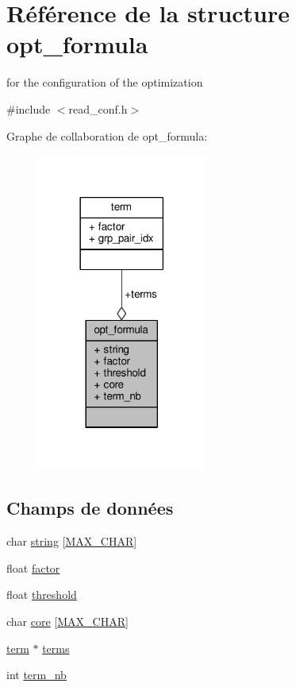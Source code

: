 \hypertarget{structopt__formula}{\section{Référence de la structure opt\+\_\+formula}
\label{structopt__formula}
}


for the configuration of the optimization  




{\ttfamily \#include $<$read\+\_\+conf.\+h$>$}



Graphe de collaboration de opt\+\_\+formula\+:\nopagebreak
\begin{figure}[H]
\begin{center}
\leavevmode
\includegraphics[width=158pt]{structopt__formula__coll__graph}
\end{center}
\end{figure}
\subsection*{Champs de données}
\begin{DoxyCompactItemize}
\item 
char \hyperlink{structopt__formula_a6b5a48d9fd86a6c9d7eb08e2218c382d}{string} \mbox{[}\hyperlink{utils_8h_a82acb32225c05e9aa4c524c40bc5852a}{M\+A\+X\+\_\+\+C\+H\+A\+R}\mbox{]}
\item 
float \hyperlink{structopt__formula_ad605fd58d412c3f432e712901c48fb63}{factor}
\item 
float \hyperlink{structopt__formula_abbe0c9a081cd5aea377286c914e5371c}{threshold}
\item 
char \hyperlink{structopt__formula_a3402a90a45675c67bb00037812216906}{core} \mbox{[}\hyperlink{utils_8h_a82acb32225c05e9aa4c524c40bc5852a}{M\+A\+X\+\_\+\+C\+H\+A\+R}\mbox{]}
\item 
\hyperlink{structterm}{term} $\ast$ \hyperlink{structopt__formula_a26227308e487fa63c9a10bba39a856b0}{terms}
\item 
int \hyperlink{structopt__formula_a88d621da87e6c9a3787c7e69d78d8a69}{term\+\_\+nb}
\end{DoxyCompactItemize}


